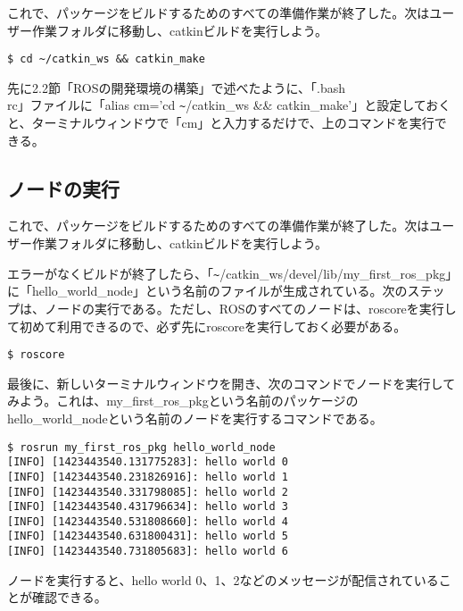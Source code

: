 これで、パッケージをビルドするためのすべての準備作業が終了した。次はユーザー作業フォルダに移動し、catkinビルドを実行しよう。

\begin{lstlisting}[language=ROS]
$ cd ~/catkin_ws && catkin_make
\end{lstlisting}

\begin{exercise}[短縮コマンド]
先に2.2節「ROSの開発環境の構築」で述べたように、「.bash\\rc」ファイルに「alias cm='cd \verb|~|/catkin\_ws \&\& catkin\_make'」と設定しておくと、ターミナルウィンドウで「cm」と入力するだけで、上のコマンドを実行できる。
\end{exercise}

\subsection{ノードの実行}

これで、パッケージをビルドするためのすべての準備作業が終了した。次はユーザー作業フォルダに移動し、catkinビルドを実行しよう。

エラーがなくビルドが終了したら、「\verb|~|/catkin\_ws/devel/lib/my\_first\_ros\_pkg」に「hello\_world\_node」という名前のファイルが生成されている。次のステップは、ノードの実行である。ただし、ROSのすべてのノードは、roscoreを実行して初めて利用できるので、必ず先にroscoreを実行しておく必要がある。

\begin{lstlisting}[language=ROS]
$ roscore
\end{lstlisting}

最後に、新しいターミナルウィンドウを開き、次のコマンドでノードを実行してみよう。これは、my\_first\_ros\_pkgという名前のパッケージのhello\_world\_nodeという名前のノードを実行するコマンドである。

\begin{lstlisting}[language=ROS]
$ rosrun my_first_ros_pkg hello_world_node
[INFO] [1423443540.131775283]: hello world 0
[INFO] [1423443540.231826916]: hello world 1
[INFO] [1423443540.331798085]: hello world 2
[INFO] [1423443540.431796634]: hello world 3
[INFO] [1423443540.531808660]: hello world 4
[INFO] [1423443540.631800431]: hello world 5
[INFO] [1423443540.731805683]: hello world 6
\end{lstlisting}

ノードを実行すると、hello world 0、1、2などのメッセージが配信されていることが確認できる。

